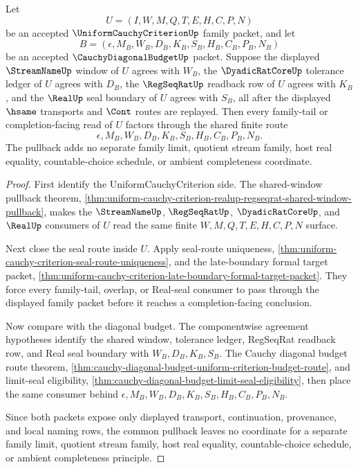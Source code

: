 \begin{theorem}
\label{thm:uniform-cauchy-criterion-diagonal-budget-pullback}
Let
$$
U=(I,W,M,Q,T,E,H,C,P,N)
$$
be an accepted $\UniformCauchyCriterionUp$ family packet, and let
$$
B=(\epsilon,M_B,W_B,D_B,K_B,S_B,H_B,C_B,P_B,N_B)
$$
be an accepted $\CauchyDiagonalBudgetUp$ packet. Suppose the displayed $\StreamNameUp$ window of $U$ agrees with $W_B$, the $\DyadicRatCoreUp$ tolerance ledger of $U$ agrees with $D_B$, the $\RegSeqRatUp$ readback row of $U$ agrees with $K_B$, and the $\RealUp$ seal boundary of $U$ agrees with $S_B$, all after the displayed $\hsame$ transports and $\Cont$ routes are replayed. Then every family-tail or completion-facing read of $U$ factors through the shared finite route
$$
\epsilon,M_B,W_B,D_B,K_B,S_B,H_B,C_B,P_B,N_B.
$$
The pullback adds no separate family limit, quotient stream family, host real equality, countable-choice schedule, or ambient completeness coordinate.
\end{theorem}
\begin{proof}
First identify the UniformCauchyCriterion side. The shared-window pullback theorem, \autoref{thm:uniform-cauchy-criterion-realup-regseqrat-shared-window-pullback}, makes the $\StreamNameUp$, $\RegSeqRatUp$, $\DyadicRatCoreUp$, and $\RealUp$ consumers of $U$ read the same finite $W,M,Q,T,E,H,C,P,N$ surface.

Next close the seal route inside $U$. Apply seal-route uniqueness, \autoref{thm:uniform-cauchy-criterion-seal-route-uniqueness}, and the late-boundary formal target packet, \autoref{thm:uniform-cauchy-criterion-late-boundary-formal-target-packet}. They force every family-tail, overlap, or Real-seal consumer to pass through the displayed family packet before it reaches a completion-facing conclusion.

Now compare with the diagonal budget. The componentwise agreement hypotheses identify the shared window, tolerance ledger, RegSeqRat readback row, and Real seal boundary with $W_B,D_B,K_B,S_B$. The Cauchy diagonal budget route theorem, \autoref{thm:cauchy-diagonal-budget-uniform-criterion-budget-route}, and limit-seal eligibility, \autoref{thm:cauchy-diagonal-budget-limit-seal-eligibility}, then place the same consumer behind $\epsilon,M_B,W_B,D_B,K_B,S_B,H_B,C_B,P_B,N_B$.

Since both packets expose only displayed transport, continuation, provenance, and local naming rows, the common pullback leaves no coordinate for a separate family limit, quotient stream family, host real equality, countable-choice schedule, or ambient completeness principle.
\end{proof}

